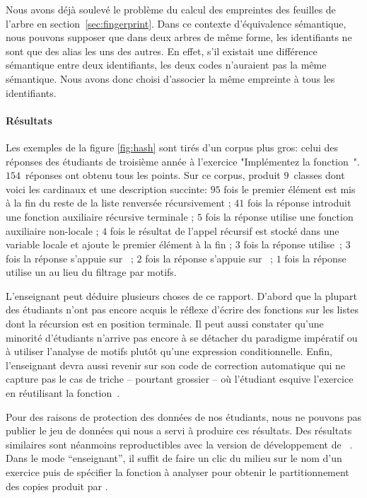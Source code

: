 Nous avons déjà soulevé le problème du calcul des empreintes des
feuilles de l'arbre en section~\ref{sec:fingerprint}. Dans ce contexte
d'équivalence sémantique, nous pouvons supposer que dans deux arbres
de même forme, les identifiants ne sont que des alias les uns des
autres. En effet, s'il existait une différence sémantique entre deux
identifiants, les deux codes n'auraient pas la même sémantique.  Nous
avons donc choisi d'associer la même empreinte à tous les
identifiants.  

\paragraph{Résultats}

Les exemples de la figure \ref{fig:hash} sont tirés d'un corpus plus
gros: celui des réponses des étudiants de troisième année à l'exercice "Implémentez la fonction~". $154$~réponses ont
obtenu tous les points. Sur ce corpus, {\Asak} produit $9$~classes
dont voici les cardinaux et une description succinte: $95$ fois le
premier élément est mis à la fin du reste de la liste renversée
récursivement ; $41$ fois la réponse introduit une fonction auxiliaire
récursive terminale ; $5$ fois la réponse utilise une fonction
auxiliaire non-locale ; $4$ fois le résultat de l'appel récursif est
stocké dans une variable locale et ajoute le premier élément à la fin
; $3$ fois la réponse utilise~; $3$ fois la réponse
s'appuie sur~ ; $2$ fois la réponse s'appuie
sur~ ; $1$ fois la réponse utilise
un  au lieu du filtrage par motifs.

L'enseignant peut déduire plusieurs choses de ce rapport. D'abord que
la plupart des étudiants n'ont pas encore acquis le réflexe d'écrire
des fonctions sur les listes dont la récursion est en position
terminale. Il peut aussi constater qu'une minorité d'étudiants
n'arrive pas encore à se détacher du paradigme impératif ou à utiliser
l'analyse de motifs plutôt qu'une expression conditionnelle. Enfin,
l'enseignant devra aussi revenir sur son code de correction automatique
qui ne capture pas le cas de triche -- pourtant grossier -- où l'étudiant
esquive l'exercice en réutilisant la fonction~.

Pour des raisons de protection des données de nos étudiants, nous ne
pouvons pas publier le jeu de données qui nous a servi à produire ces
résultats. Des résultats similaires sont néanmoins reproductibles avec
la version de développement de {\LearnOCaml}~\cite{learnocaml}. Dans le
mode ``enseignant'', il suffit de faire un clic du milieu sur le nom
d'un exercice puis de spécifier la fonction à analyser pour obtenir le
partitionnement des copies produit par {\Asak}.
